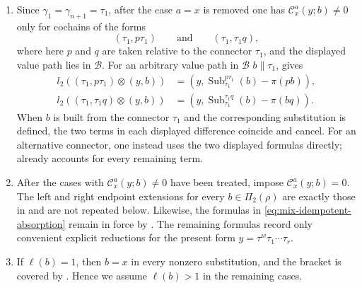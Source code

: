 \documentclass[11pt,a4paper,reqno]{amsart}
\newcommand{\mB}{\mathcal B}
\newcommand{\mC}{\mathcal C}
\newcommand{\Sub}{\operatorname{Sub}}
\newcommand{\para}[2]{(#1,#2)}
\theoremstyle{plain}
\theoremstyle{definition}
\numberwithin{equation}{section}
\begin{document}
	\begin{enumerate}
		\item Since
		$\gamma_1=\gamma_{n+1}=\tau_1$, after the case $a=x$ is removed one has
		$\mC_x^a(y;b)\neq0$ only for cochains of the forms
		\[
		\para{\tau_1}{p\tau_1}
		\qquad\text{and}\qquad
		\para{\tau_1}{\tau_1q},
		\]
		where here $p$ and $q$ are taken relative to the connector $\tau_1$, and
		the displayed value path lies in $\mB$.  For an arbitrary value path in $\mB$
		$b\parallel\tau_1$,  gives
		\begin{align}
			l_2(\para{\tau_1}{p\tau_1}\otimes\para{y}{b})
			&=
			\para{y}{\Sub_{\tau_1}^{p\tau_1}(b)-\pi(pb)},
			\label{eq:r1-left-correction-general}\\
			l_2(\para{\tau_1}{\tau_1q}\otimes\para{y}{b})
			&=
			\para{y}{\Sub_{\tau_1}^{\tau_1q}(b)-\pi(bq)}.
			\label{eq:r1-right-correction-general}
		\end{align}
		When $b$ is built from the connector $\tau_1$ and the corresponding
		substitution is defined, the two terms in each displayed difference coincide
		and cancel.  For an alternative connector, one instead uses the two displayed
		formulas directly;  already accounts for every remaining term.
		
		\item After the cases with $\mC_x^a(y;b)\neq0$ have been treated, impose
		$\mC_x^a(y;b)=0$.  The left and right endpoint extensions
		for every $b\in\Pi_2(\rho)$ are exactly those in
		 and are not repeated below.
		Likewise, the formulas in \eqref{eq:mix-idempotent-absorption} remain in force by
		.  The remaining formulas record
		only convenient explicit reductions for the present form $y=\tau^w\tau_1\cdots\tau_r$.
		
		\item If $\ell(b)=1$, then $b=x$ in every nonzero substitution, and the
		bracket is covered by .  Hence we assume $\ell(b)>1$ in the
		remaining cases.
		

\end{enumerate}
\end{document}

